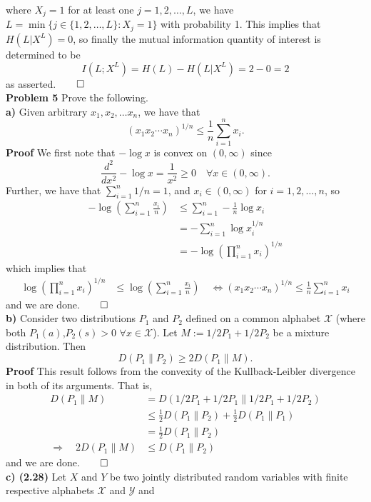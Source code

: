 \documentclass[11pt, letterpaper]{article}
\newcommand{\mc}[1]{\mathcal{#1}}
\begin{document}
where $X_j=1$ for at least one $j=1,2,\dots,L$, we have $L=\min\{j\in\{1,2,\dots,L\}: X_j=1\}$ with probability 1. This implies that $H(L|X^L)=0$, so finally the mutual information quantity of interest is determined to be
\[I(L;X^L)=H(L)-H(L|X^L)=2-0=2\]
as asserted.\hfill{$\qed$}\\[10pt]
{\bf Problem 5} Prove the following.\\[10pt]
{\bf a)} Given arbitrary $x_1,x_2,\dots x_n$, we have that
\[(x_1x_2\cdots x_n)^{1/n}\leq\frac{1}{n}\sum_{i=1}^nx_i.\]
{\bf Proof} We first note that $-\log x$ is convex on $(0,\infty)$ since
\[\frac{d^2}{dx^2}-\log x=\frac{1}{x^2}\geq 0\quad\forall x\in(0,\infty).\]
Further, we have that $\sum_{i=1}^n1/n=1$, and $x_i\in(0,\infty)$ for $i=1,2,\dots,n$, so
\begin{align*}
    -\log\left(\sum_{i=1}^n\frac{x_i}{n}\right)&\leq \sum_{i=1}^n-\frac{1}{n}\log x_i\tag{by convexity of $-\log x$ on $(0,\infty)$}\\
    &=-\sum_{i=1}^n\log x_i^{1/n}\\
    &=-\log\left(\prod_{i=1}^nx_i\right)^{1/n}
\end{align*}
which implies that
\begin{align*}
    \log\left(\prod_{i=1}^nx_i\right)^{1/n}&\leq\log\left(\sum_{i=1}^n\frac{x_i}{n}\right)\quad\Leftrightarrow (x_1x_2\cdots x_n)^{1/n}\leq\frac{1}{n}\sum_{i=1}^nx_i\tag{since $\log$ is monotonic increasing}
\end{align*}
and we are done.\hfill{$\qed$}\\[10pt]
{\bf b)} Consider two distributions $P_1$ and $P_2$ defined on a common alphabet $\mc{X}$ (where both $P_1(a)$,$P_2(s)>0$ $\forall x\in\mc{X}$).
Let $M:=1/2P_1+1/2P_2$ be a mixture distribution. Then
\[D(P_1\|P_2)\geq 2D(P_1\|M).\]
{\bf Proof} This result follows from the convexity of the Kullback-Leibler divergence in both of its arguments. That is,
\begin{align*}
    D(P_1\|M)&=D(1/2P_1+1/2P_1\|1/2P_1+1/2P_2)\\
    &\leq \frac{1}{2}D(P_1\|P_2)+\frac{1}{2}D(P_1\|P_1)\\
    &=\frac{1}{2}D(P_1\|P_2)\tag{since $D(P_1\|P_1)=0$}\\
    \Rightarrow\quad 2D(P_1\|M)&\leq D(P_1\|P_2)
\end{align*}
and we are done.\hfill{$\qed$}\\[10pt]
{\bf c) (2.28)} Let $X$ and $Y$ be two jointly distributed random variables with finite respective alphabets $\mc{X}$ and $\mc{Y}$ and
\end{document}
